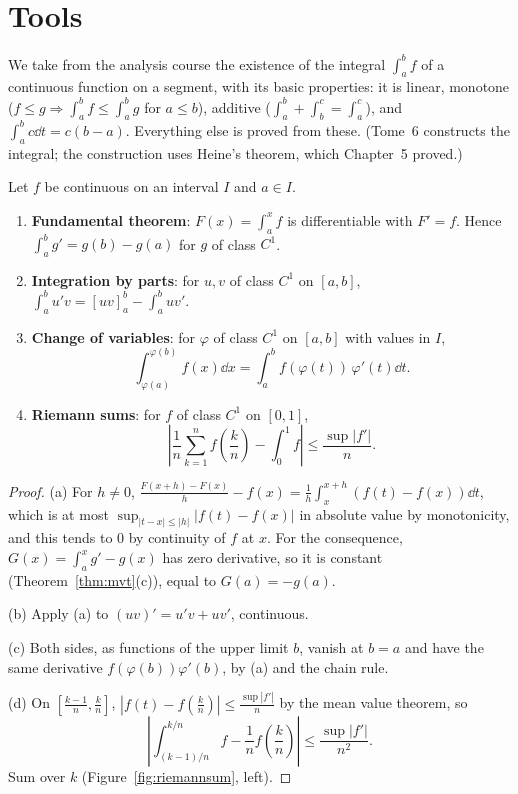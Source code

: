 \section{Tools}

We take from the analysis course the existence of the integral $\int_a^bf$ of a continuous function on a segment, with its basic properties: it is linear, monotone ($f\le g\Rightarrow\int_a^bf\le\int_a^bg$ for $a\le b$), additive ($\int_a^b+\int_b^c=\int_a^c$), and $\int_a^bc\dd t=c(b-a)$. Everything else is proved from these. (Tome~6 constructs the integral; the construction uses Heine's theorem, which Chapter~5 proved.)

\begin{proposition}\label{prop:inttools}
Let $f$ be continuous on an interval $I$ and $a\in I$.
\begin{enumerate}[label=(\alph*)]
\item \textbf{Fundamental theorem}: $F(x)=\int_a^xf$ is differentiable with $F'=f$. Hence $\int_a^bg'=g(b)-g(a)$ for $g$ of class $C^1$.
\item \textbf{Integration by parts}: for $u,v$ of class $C^1$ on $[a,b]$, $\int_a^bu'v=[uv]_a^b-\int_a^buv'$.
\item \textbf{Change of variables}: for $\varphi$ of class $C^1$ on $[a,b]$ with values in $I$,
\[\int_{\varphi(a)}^{\varphi(b)}f(x)\dd x=\int_a^bf(\varphi(t))\,\varphi'(t)\dd t.\]
\item \textbf{Riemann sums}: for $f$ of class $C^1$ on $[0,1]$,
\[\left|\frac1n\sum_{k=1}^nf\left(\frac kn\right)-\int_0^1f\right|\le\frac{\sup|f'|}{n}.\]
\end{enumerate}
\end{proposition}
\begin{proof}
(a) For $h\ne0$, $\frac{F(x+h)-F(x)}h-f(x)=\frac1h\int_x^{x+h}(f(t)-f(x))\dd t$, which is at most $\sup_{|t-x|\le|h|}|f(t)-f(x)|$ in absolute value by monotonicity, and this tends to $0$ by continuity of $f$ at $x$. For the consequence, $G(x)=\int_a^xg'-g(x)$ has zero derivative, so it is constant (Theorem~\ref{thm:mvt}(c)), equal to $G(a)=-g(a)$.

(b) Apply (a) to $(uv)'=u'v+uv'$, continuous.

(c) Both sides, as functions of the upper limit $b$, vanish at $b=a$ and have the same derivative $f(\varphi(b))\varphi'(b)$, by (a) and the chain rule.

(d) On $\left[\frac{k-1}n,\frac kn\right]$, $|f(t)-f(\frac kn)|\le\frac{\sup|f'|}n$ by the mean value theorem, so
\[\left|\int_{(k-1)/n}^{k/n}f-\frac1nf\left(\frac kn\right)\right|\le\frac{\sup|f'|}{n^2}.\]
Sum over $k$ (Figure~\ref{fig:riemannsum}, left).
\end{proof}

